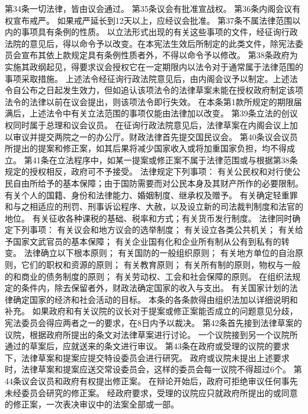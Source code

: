     第34条一切法律，皆由议会通过。
    第35条议会有批准宣战权。
    第36条内阁会议有权宣布戒严。
    如果戒严延长到12天以上，应经议会批准。
    第37条不属法律范围以内的事项具有条例的性质。
    以立法形式出现的有关这些事项的文件，经征询行政法院的意见后，得以命令予以改变。在本宪法生效后所制定的此类文件，除宪法委员会宣布其依上款规定具有条例性质者外，不得以命令予以修改。
    第38条政府为实施其政纲起见，得要求议会授权它在一定期限内以法令对于通常属于法律范围的事项采取措施。
    上述法令经征询行政法院意见后，由内阁会议予以制定。上述法令自公布之日起发生效力，但如追认该项法令的法律草案未能在授权政府制定该项法令的法律以前在议会提出，则该项法令即行失效。
    在本条第1款所规定的期限届满后，上述法令中有关立法范围的事项仅能由法律加以改变。
    第39条立法的创议权同时属于总理和议会议员。
    在征询行政法院意见后，法律草案在内阁会议上加以审议并提交两院之一的办公厅。财政法律首先提交国民议会。
    第40条议会议员所提出的提案和修正案，如其后果将减少国家收入或将加重国家负担，均不得成立。
    第41条在立法程序中，如某一提案或修正案不属于法律范围或与根据第38条规定的授权相反，政府可不予接受。
    法律规定下列事项：
    有关公民权和对行使公民自由所给予的基本保障；由于国防需要而对公民本身及其财产所作的必要限制。
    有关个人的国籍、身份和法律能力、婚姻制度、继承权及赠予。
    有关确定轻重罪和与之相适应的刑罚、刑事诉讼程序、大赦，以及设立新的司法裁判制度和法官的地位。
    有关征收各种课税的基础、税率和方式；有关货币发行制度。
    法律同时确定下列事项：
    有关议会和地方议会的选举制度；
    有关设立各类公共机关；
    有关给予国家文武官员的基本保障；
    有关企业国有化和企业所有制从公有到私有的转变。
    法律确立以下根本原则；
    有关国防的一般组织原则；
    有关地方单位的自治原则，它们的职权和资源的原则；
    有关教育原则；
    有关所有制的原则，物权与一般的和商业的债务制度的原则；
    有关劳动权、工会和社会保障的原则。
    在组织法规定的条件内，除去保留者外，财政法确定国家的收入与支出。
    有关国家计划的法律确定国家的经济和社会活动的目标。
    本条的各条款得由组织法加以详细说明和补充。
    如果政府和有关议院的议长对于提案或修正案能否成立的问题意见分歧，宪法委员会得应两者之一的要求，在8日内予以裁决。
    第42条首先接到法律草案的议院，根据政府所提出的条文对法律草案进行讨论。
    一个议院接到另一个议院所通过的草案后，应就送来的条文进行审议。
    第43条在政府或受理的议院的要求下，法律草案和提案应提交特设委员会进行研究。
    政府或议院未提出上述要求时，法律草案和提案应送交常设委员会，这样的委员会每一议院不得超过6个。
    第44条议会议员和政府有权提出修正案。
    在辩论开始后，政府可拒绝审议任何事先未经委员会研究的修正案。
    经政府要求，受理的议院应只就政府所提出的或同意的修正案，一次表决审议中的法案全部或一部。

